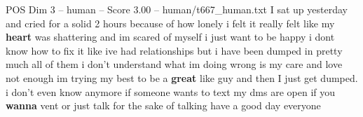 \begin{textsample}{POS Dim 3 – human – Score 3.00 – human/t667\_human.txt}  \label{ex:f3_pos_017}
I sat up yesterday and cried for a solid 2 hours because of how lonely i felt it really felt like my \textbf{heart} was shattering and im scared of myself i just want to be happy i dont know how to fix it like ive had relationships but i have been dumped in pretty much all of them i don't understand what im doing wrong is my care and love not enough im trying my best to be a \textbf{great} like guy and then I just get dumped. i don't even know anymore if someone wants to text my dms are open if you \textbf{wanna} vent or just talk for the sake of talking have a good day everyone

\end{textsample}
